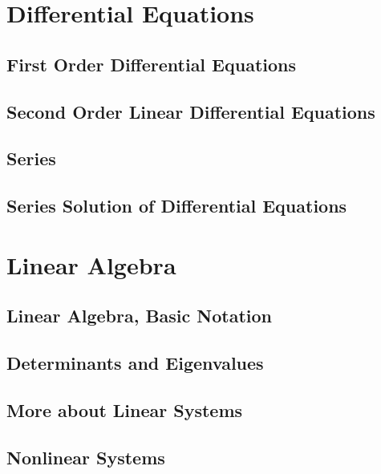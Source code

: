 \documentclass[10pt]{book}              %
\begin{document}
\part{Differential Equations}
\restoregeometry
\chapter{First Order Differential Equations}

\chapter{Second Order Linear Differential Equations}

\chapter{Series}

\chapter{Series Solution of Differential Equations}


\part{Linear Algebra}
\restoregeometry
\chapter{Linear Algebra, Basic Notation}

\chapter{Determinants and Eigenvalues}

\chapter{More about Linear Systems}

\chapter{Nonlinear Systems}


\end{document}
